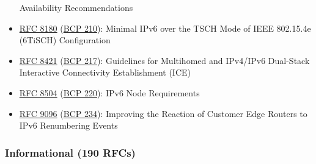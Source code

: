 \documentclass[
]{article}
\begin{document}
\begin{itemize}
  Availability Recommendations
\item
  \href{https://www.rfc-editor.org/info/rfc8180}{RFC 8180}
  (\href{https://www.rfc-editor.org/info/bcp210}{BCP 210}): Minimal IPv6
  over the TSCH Mode of IEEE 802.15.4e (6TiSCH) Configuration
\item
  \href{https://www.rfc-editor.org/info/rfc8421}{RFC 8421}
  (\href{https://www.rfc-editor.org/info/bcp217}{BCP 217}): Guidelines
  for Multihomed and IPv4/IPv6 Dual-Stack Interactive Connectivity
  Establishment (ICE)
\item
  \href{https://www.rfc-editor.org/info/rfc8504}{RFC 8504}
  (\href{https://www.rfc-editor.org/info/bcp220}{BCP 220}): IPv6 Node
  Requirements
\item
  \href{https://www.rfc-editor.org/info/rfc9096}{RFC 9096}
  (\href{https://www.rfc-editor.org/info/bcp234}{BCP 234}): Improving
  the Reaction of Customer Edge Routers to IPv6 Renumbering Events
\end{itemize}

\subsubsection{Informational (190 RFCs)}\label{informational-190-rfcs}
\end{document}
